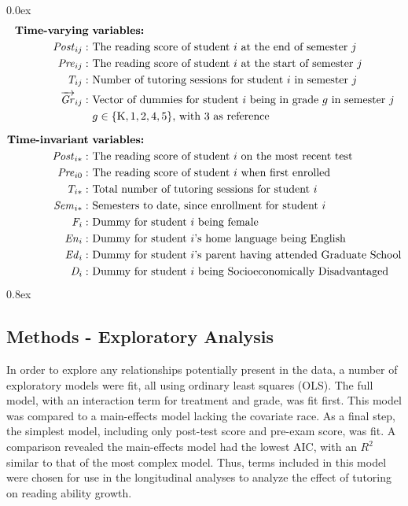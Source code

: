 \documentclass[a0,landscape]{a0poster}
\begin{document}
\begin{multicols}{3}
\parskip 0.0ex
\begin{align*}
\text{\textbf{Time-varying}} & \text{ \textbf{variables:}} \\
\mathit{Post}_{ij}: & \text{ The reading score of student } i \text{ at the end of semester } j \\
\mathit{Pre}_{ij}: & \text{ The reading score of student } i \text{ at the start of semester } j \\
\mathit{T}_{ij}: & \text{ Number of tutoring sessions for student } i  \text{ in semester } j \\
\overrightarrow{\mathit{Gr}}_{ij}: & \text{ Vector of dummies for student } i 
      \text{ being in grade } g \text{ in semester } j \\
  & ~ g \in \{\mathrm{K}, 1, 2, 4, 5\} \text {, with 3 as reference}  \\[1.5ex]
\text{\textbf{Time-invariant}} & \text{ \textbf{variables:}} \\
\mathit{Post}_{i*}: & \text{ The reading score of student } i \text{ on the most recent test } \\
\mathit{Pre}_{i0}: & \text{ The reading score of student } i \text{ when first enrolled } \\
\mathit{T}_{i*}: & \text{ Total number of tutoring sessions for student } i \\
\mathit{Sem}_{i*}: & \text{ Semesters to date, since enrollment for student } i \\
\mathit{F}_{i}: & \text{ Dummy for student } i  \text{ being female } \\ 
\mathit{En}_{i}: & \text{ Dummy for student } i \text{'s home language being English } \\ 
\mathit{Ed}_{i}: & \text{ Dummy for student } i \text{'s parent having attended Graduate School} \\ 
\mathit{D}_{i}: & \text{ Dummy for student } i \text{ being Socioeconomically Disadvantaged } \\ 
\end{align*}
\parskip 0.8ex

\subsection*{Methods - Exploratory Analysis}

In order to explore any relationships potentially present
in the data, a number of exploratory models were fit,
all using ordinary least squares (OLS).
The full model, with an interaction term for treatment and grade,
was fit first. This model was compared to a main-effects model
lacking the covariate race.
As a final step, the simplest model, including only
post-test score and pre-exam score, was fit.
A comparison revealed the main-effects model had the lowest AIC,
with an $R^{2}$ similar to that of the most complex model.
Thus, terms included in this model were chosen for use in the
longitudinal analyses to analyze the effect of tutoring on
reading ability growth.


\end{multicols}
\end{document}
